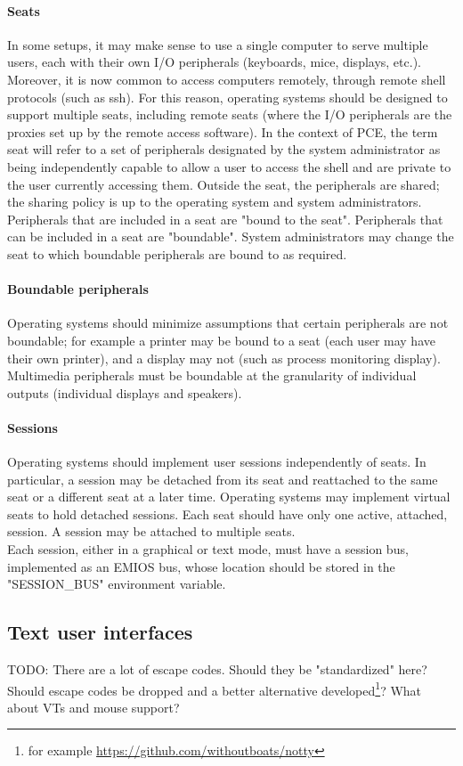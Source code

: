 \documentclass[a4paper,utf8,11pt]{article}
\begin{document}
	\paragraph{Seats}
	In some setups, it may make sense to use a single computer to serve multiple users, each with their own I/O peripherals (keyboards, mice, displays, etc.). Moreover, it is now common to access computers remotely, through remote shell protocols (such as ssh). For this reason, operating systems should be designed to support multiple seats, including remote seats (where the I/O peripherals are the proxies set up by the remote access software). In the context of PCE, the term seat will refer to a set of peripherals designated by the system administrator as being independently capable to allow a user to access the shell and are private to the user currently accessing them. Outside the seat, the peripherals are shared; the sharing policy is up to the operating system and system administrators. Peripherals that are included in a seat are "bound to the seat". Peripherals that can be included in a seat are "boundable". System administrators may change the seat to which boundable peripherals are bound to as required.
	\paragraph{Boundable peripherals}
	Operating systems should minimize assumptions that certain peripherals are not boundable; for example a printer may be bound to a seat (each user may have their own printer), and a display may not (such as process monitoring display).\\
	Multimedia peripherals must be boundable at the granularity of individual outputs (individual displays and speakers).
	\paragraph{Sessions}
	Operating systems should implement user sessions independently of seats. In particular, a session may be detached from its seat and reattached to the same seat or a different seat at a later time. Operating systems may implement virtual seats to hold detached sessions. Each seat should have only one active, attached, session. A session may be attached to multiple seats.\\
	Each session, either in a graphical or text mode, must have a session bus, implemented as an EMIOS bus, whose location should be stored in the "SESSION\_BUS" environment variable.
	\subsection{Text user interfaces}
	TODO: There are a lot of escape codes. Should they be "standardized" here? Should escape codes be dropped and a better alternative developed\footnote{for example \url{https://github.com/withoutboats/notty}}? What about VTs and mouse support?
\end{document}
